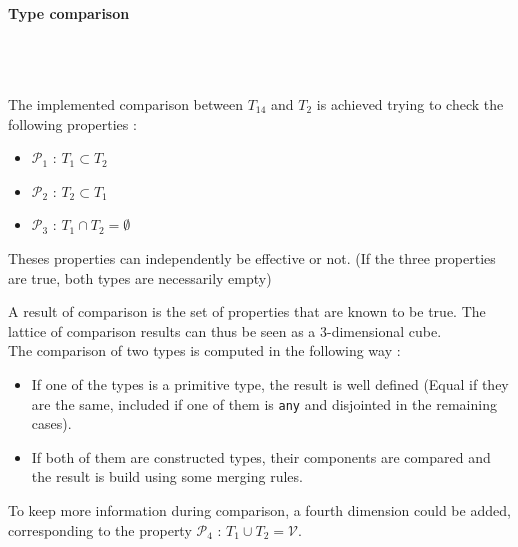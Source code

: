 \documentclass[10pt,a4paper]{article}
\newcommand{\code}{\texttt}
\renewcommand{\indent}{~\\\vspace{-.8cm}}
\newcommand{\val}{\mathcal V}
\begin{document}
\paragraph{Type comparison}~\\\indent


The implemented comparison between $T_14$ and $T_2$ is achieved trying to check the following properties :
\begin{itemize}
\item $\mathcal P_1$ : $T_1 \subset T_2$
\item $\mathcal P_2$ : $T_2 \subset T_1$
\item $\mathcal P_3$ : $T_1 \cap T_2 = \emptyset$
\end{itemize}

Theses properties can independently be effective or not. (If the three properties are true, both types are necessarily empty)


A result of comparison is the set of properties that are known to be true. The lattice of comparison results can thus be seen as a 3-dimensional cube.\\


The comparison of two types is computed in the following way :
\begin{itemize}
	\item If one of the types is a primitive type, the result is well defined (Equal if they are the same, included if one of them is \code{any} and disjointed in the remaining cases). 
	\item If both of them are constructed types, their components are compared and the result is build using some merging rules.
\end{itemize}


%










To keep more information during comparison, a fourth dimension could be added, corresponding to the property $\mathcal P_4$ : $T_1 \cup T_2 = \val$.\\
\end{document}
